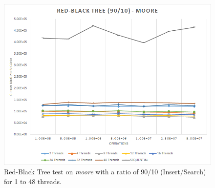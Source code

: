\documentclass[oneside,a4paper]{scrartcl}
\begin{document}
\begin{figure}
	\centering
	\includegraphics[width=1.0\textwidth]{results9010.png}
	\caption{Red-Black Tree test on \emph{moore} with a ratio of 90/10 (Insert/Search) for 1 to 48 threads.}
	\label{plot_9010}
\end{figure}
\end{document}
